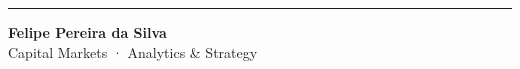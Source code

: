 \documentclass{beamer}
\begin{document}
{\begin{frame}
\begin{minipage}{87mm}
    \vspace{9mm}

    {\color{Border}\rule{40mm}{0.5pt}}

    \vspace{4mm}

    {\fontsize{9.5}{12}\selectfont\textcolor{TxtPrimary}{\textbf{Felipe Pereira da Silva}}}\\[1pt]
    {\fontsize{7.5}{9.5}\selectfont\textcolor{TxtSub}{Capital Markets · Analytics \& Strategy}}
  \end{minipage}
\end{frame}
}


\end{document}
